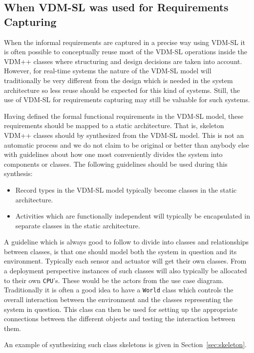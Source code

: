 \documentclass{overturerepchap}
\begin{document}
\subsection{When VDM-SL was used for Requirements Capturing}

When the informal requirements are captured in a precise way using
VDM-SL it is often possible to conceptually
reuse most of the VDM-SL operations
inside the VDM++ classes where structuring and design decisions are taken
into account.  However, for
real-time systems the nature of the VDM-SL model will traditionally be
very different from the design which is needed in the system
architecture so less reuse should be expected for this kind of
systems. Still, the use of VDM-SL for requirements capturing may
still be valuable for such systems.

Having defined the formal functional requirements in the VDM-SL model,
these requirements should be mapped to a static architecture. That is,
skeleton VDM++ classes should by synthesized from the VDM-SL
model. This is not an automatic process and we do not claim to be
original or better than anybody else with guidelines about how one
most conveniently divides the system into components or classes.  The
following guidelines should be used during this synthesis:

\begin{itemize}
\item Record types in the VDM-SL model typically become classes in the
static architecture.
\item Activities which are functionally independent will typically be
encapsulated in separate classes in the static architecture.
\end{itemize}

A guideline which is always good to follow to divide into classes and
relationships between classes, is that one should model both the
system in question and its environment. Typically each sensor and
actuator will get their own classes. From a deployment perspective
instances of such classes will also typically be allocated to their
own \texttt{CPU}'s. These would be the actors from the use case
diagram. Traditionally it is often a good idea to have a
\texttt{World} class which controls the overall interaction between the
environment and the classes representing the system in question. This
class can then be used for setting up the appropriate connections
between the different objects and testing the interaction between
them.

An example of synthesizing such class skeletons is given in
Section~\ref{sec:skeleton}.
\end{document}

